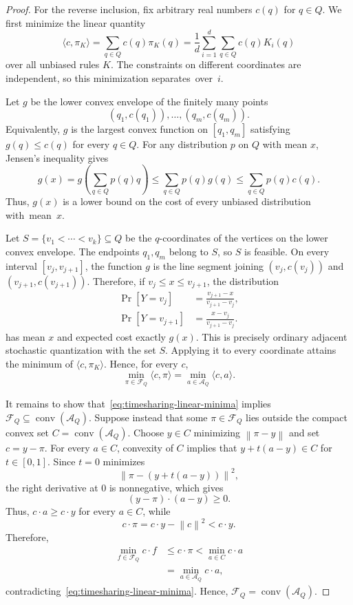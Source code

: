 \documentclass[11pt,letterpaper]{article}
\newcommand{\norm}[1]{\left\lVert#1\right\rVert}
\begin{document}
{\begin{proof}
For the reverse inclusion, fix arbitrary real numbers $c(q)$ for $q\in Q$.
We first minimize the linear quantity
\[
\langle c,\pi_K\rangle
=\sum_{q\in Q}c(q)\pi_K(q)
=\frac{1}{d}\sum_{i=1}^d\sum_{q\in Q}c(q)K_i(q)
\]
over all unbiased rules $K$. The constraints on different coordinates are
independent, so this minimization \mbox{separates over $i$.}

Let $g$ be the lower convex envelope of the finitely many points
\[
(q_1,c(q_1)),\ldots,(q_m,c(q_m)).
\]
Equivalently, $g$ is the largest convex function on $[q_1,q_m]$ satisfying
$g(q)\le c(q)$ for every $q\in Q$. For any distribution $p$ on $Q$ with mean
$x$, Jensen's inequality gives
\[
g(x)
=g\!\left(\sum_{q\in Q}p(q)q\right)
\le\sum_{q\in Q}p(q)g(q)
\le\sum_{q\in Q}p(q)c(q).
\]
Thus, $g(x)$ is a lower bound on the cost of every unbiased distribution \mbox{with
mean $x$.}

Let $S=\{v_1<\cdots<v_k\}\subseteq Q$ be the $q$-coordinates of the vertices
on the lower convex envelope. The endpoints $q_1,q_m$ belong to $S$, so $S$ is
feasible. On every interval $[v_j,v_{j+1}]$, the function $g$ is the line
segment joining $(v_j,c(v_j))$ and $(v_{j+1},c(v_{j+1}))$. Therefore, if
$v_j\le x\le v_{j+1}$, the distribution
\begin{align*}
\Pr[Y=v_j]
&=\frac{v_{j+1}-x}{v_{j+1}-v_j},\\
\Pr[Y=v_{j+1}]
&=\frac{x-v_j}{v_{j+1}-v_j}.
\end{align*}
has mean $x$ and expected cost exactly $g(x)$. This is precisely ordinary
adjacent stochastic quantization with the set $S$. Applying it to every
coordinate attains the minimum of $\langle c,\pi_K\rangle$. Hence, for every
$c$,
\begin{equation}
\min_{\pi\in\mathcal{F}_Q}\langle c,\pi\rangle
=\min_{a\in\mathcal{A}_Q}\langle c,a\rangle.
\label{eq:timesharing-linear-minima}
\end{equation}

It remains to show that~\eqref{eq:timesharing-linear-minima} implies
$\mathcal{F}_Q\subseteq\operatorname{conv}(\mathcal{A}_Q)$. Suppose instead
that some $\pi\in\mathcal{F}_Q$ lies outside the compact convex set
$C=\operatorname{conv}(\mathcal{A}_Q)$. Choose $y\in C$ minimizing
$\norm{\pi-y}$ and set $c=y-\pi$. For every $a\in C$, convexity of $C$ implies
that $y+t(a-y)\in C$ for $t\in[0,1]$. Since $t=0$ minimizes
\[
\norm{\pi-(y+t(a-y))}^2,
\]
the right derivative at $0$ is nonnegative, which gives
\[
(y-\pi)\cdot(a-y)\ge0.
\]
Thus, $c\cdot a\ge c\cdot y$ for every $a\in C$, while
\[
c\cdot\pi=c\cdot y-\norm{c}^2<c\cdot y.
\]
Therefore,
\begin{align*}
\min_{f\in\mathcal{F}_Q}c\cdot f
&\le c\cdot\pi
<\min_{a\in C}c\cdot a\\
&=\min_{a\in\mathcal{A}_Q}c\cdot a,
\end{align*}
contradicting~\eqref{eq:timesharing-linear-minima}. Hence,
$\mathcal{F}_Q=\operatorname{conv}(\mathcal{A}_Q)$.
\end{proof}

}
\end{document}
